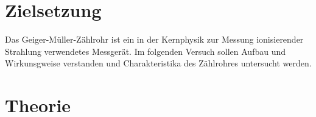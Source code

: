 \section{Zielsetzung}
\label{sec:ziel}
Das Geiger-Müller-Zählrohr ist ein in der Kernphysik zur Messung ionisierender Strahlung verwendetes Messgerät. Im folgenden Versuch sollen Aufbau 
und Wirkunsgweise verstanden und Charakteristika des Zählrohres untersucht werden.

\section{Theorie}
\label{sec:Theorie}

